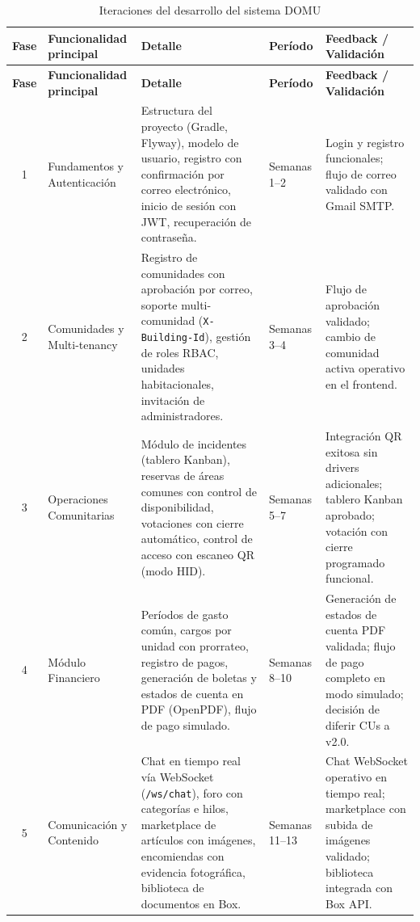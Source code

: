 \begin{longtable}{|c|p{}|p{}|p{}|p{}|}
\caption{Iteraciones del desarrollo del sistema DOMU}\label{tab:iteraciones}\\
\hline
\textbf{Fase} & \textbf{Funcionalidad principal} & \textbf{Detalle} & \textbf{Período} & \textbf{Feedback / Validación} \\
\hline
\endfirsthead
\hline
\textbf{Fase} & \textbf{Funcionalidad principal} & \textbf{Detalle} & \textbf{Período} & \textbf{Feedback / Validación} \\
\hline
\endhead
\hline
\endfoot

1 & Fundamentos y Autenticación &
Estructura del proyecto (Gradle, Flyway), modelo de usuario, registro con confirmación por correo electrónico, inicio de sesión con JWT, recuperación de contraseña. &
Semanas 1--2 &
Login y registro funcionales; flujo de correo validado con Gmail SMTP. \\
\hline

2 & Comunidades y Multi-tenancy &
Registro de comunidades con aprobación por correo, soporte multi-comunidad (\texttt{X-Building-Id}), gestión de roles RBAC, unidades habitacionales, invitación de administradores. &
Semanas 3--4 &
Flujo de aprobación validado; cambio de comunidad activa operativo en el frontend. \\
\hline

3 & Operaciones Comunitarias &
Módulo de incidentes (tablero Kanban), reservas de áreas comunes con control de disponibilidad, votaciones con cierre automático, control de acceso con escaneo QR (modo HID). &
Semanas 5--7 &
Integración QR exitosa sin drivers adicionales; tablero Kanban aprobado; votación con cierre programado funcional. \\
\hline

4 & Módulo Financiero &
Períodos de gasto común, cargos por unidad con prorrateo, registro de pagos, generación de boletas y estados de cuenta en PDF (OpenPDF), flujo de pago simulado. &
Semanas 8--10 &
Generación de estados de cuenta PDF validada; flujo de pago completo en modo simulado; decisión de diferir CUs a v2.0. \\
\hline

5 & Comunicación y Contenido &
Chat en tiempo real vía WebSocket (\texttt{/ws/chat}), foro con categorías e hilos, marketplace de artículos con imágenes, encomiendas con evidencia fotográfica, biblioteca de documentos en Box. &
Semanas 11--13 &
Chat WebSocket operativo en tiempo real; marketplace con subida de imágenes validado; biblioteca integrada con Box API. \\
\hline


\end{longtable}
